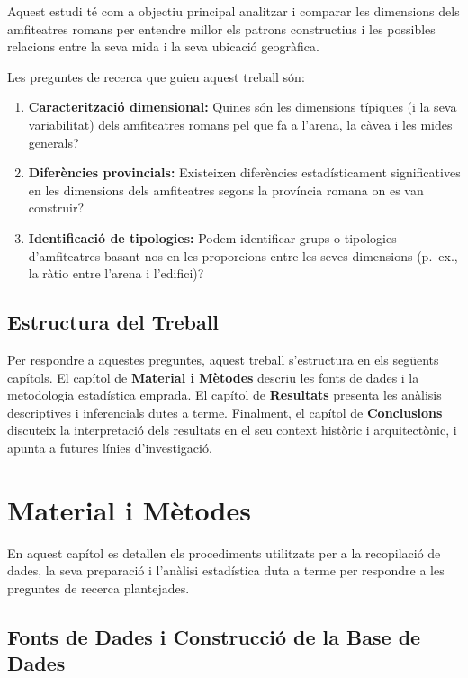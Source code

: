 \documentclass[
  12pt,
  letterpaper,
  DIV=11,
  numbers=noendperiod]{scrreprt}
\providecommand{\tightlist}{%
  \setlength{\itemsep}{0pt}\setlength{\parskip}{0pt}}
\begin{document}
Aquest estudi té com a objectiu principal analitzar i comparar les
dimensions dels amfiteatres romans per entendre millor els patrons
constructius i les possibles relacions entre la seva mida i la seva
ubicació geogràfica.

Les preguntes de recerca que guien aquest treball són:

\begin{enumerate}
\def\labelenumi{\arabic{enumi}.}
\tightlist
\item
  \textbf{Caracterització dimensional:} Quines són les dimensions
  típiques (i la seva variabilitat) dels amfiteatres romans pel que fa a
  l'arena, la càvea i les mides generals?
\item
  \textbf{Diferències provincials:} Existeixen diferències
  estadísticament significatives en les dimensions dels amfiteatres
  segons la província romana on es van construir?
\item
  \textbf{Identificació de tipologies:} Podem identificar grups o
  tipologies d'amfiteatres basant-nos en les proporcions entre les seves
  dimensions (p.~ex., la ràtio entre l'arena i l'edifici)?
\end{enumerate}

\section{Estructura del Treball}\label{estructura-del-treball}

Per respondre a aquestes preguntes, aquest treball s'estructura en els
següents capítols. El capítol de \textbf{Material i Mètodes} descriu les
fonts de dades i la metodologia estadística emprada. El capítol de
\textbf{Resultats} presenta les anàlisis descriptives i inferencials
dutes a terme. Finalment, el capítol de \textbf{Conclusions} discuteix
la interpretació dels resultats en el seu context històric i
arquitectònic, i apunta a futures línies d'investigació.


\chapter{Material i Mètodes}\label{material-i-muxe8todes}

En aquest capítol es detallen els procediments utilitzats per a la
recopilació de dades, la seva preparació i l'anàlisi estadística duta a
terme per respondre a les preguntes de recerca plantejades.

\section{Fonts de Dades i Construcció de la Base de
Dades}\label{fonts-de-dades-i-construcciuxf3-de-la-base-de-dades}
\end{document}
